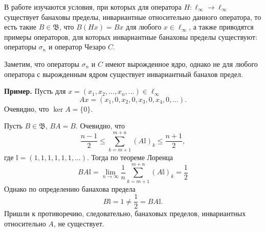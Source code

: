 В работе \cite{Semenov2010invariant} изучаются условия,
при которых для оператора $H:\ell_\infty\to \ell_\infty$ существует банаховы пределы,
инвариантные относительно данного оператора, то есть такие $B\in\mathfrak{B}$,
что $B(Hx) = Bx$ для любого $x\in\ell_\infty$,
а также приводятся примеры операторов, для которых инвариантные банаховы пределы существуют:
операторы $\sigma_n$ и оператор Чезаро $C$.

Заметим, что операторы $\sigma_n$ и $C$ имеют вырожденное ядро,
однако не для любого оператора с вырожденным ядром существует инвариантный банахов предел.

\textbf{Пример.}
Пусть для $x = (x_1, x_2, ..., x_n, ...)\in \ell_\infty$
\begin{equation*}
	Ax = (x_1, 0, x_2, 0, x_3, 0, x_4, 0, ...).
\end{equation*}
Очевидно, что $\ker A = \{0\}$.

Пусть $B\in\mathfrak{B}$, $BA = B$.
Очевидно, что
\begin{equation*}
	\frac{n-1}{2}\leqslant \sum_{k=m+1}^{m+n} (A\mathbb{I})_k \leqslant \frac{n+1}{2},
\end{equation*}
где $\mathbb{I} = (1, 1, 1, 1, 1, 1, ...)$.
Тогда по теореме Лоренца
\begin{equation*}
	BA\mathbb{I} =
	\lim_{n\to\infty} \frac{1}{n}\sum_{k=m+1}^{m+n} (A\mathbb{I})_k = \frac{1}{2}
\end{equation*}
Однако по определению банахова предела
\begin{equation*}
	B\mathbb{I} = 1 \neq \frac{1}{2} = BA\mathbb{I}.
\end{equation*}
Пришли к противоречию, следовательно, банаховых пределов, инвариантных относительно $A$, не существует.
